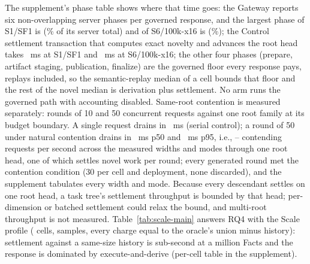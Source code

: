 \documentclass[10pt,journal,compsoc]{IEEEtran}
\begin{document}
The supplement's phase table shows where that time goes: the Gateway
reports six non-overlapping server phases per governed response, and the
largest phase of S1/SF1 is \texttt{\FinalVFivePublicationPhaseDominantSOneSFOne{}}
(\FinalVFivePublicationPhaseDominantSharePctSOneSFOne\% of its server total) and
of S6/100k-x16 is \texttt{\FinalVFivePublicationPhaseDominantSSixHundredKByteSixteen{}}
(\FinalVFivePublicationPhaseDominantSharePctSSixHundredKByteSixteen\%);
the Control settlement transaction that computes exact novelty and advances
the root head takes \FinalVFivePublicationPhaseSettlementMSSOneSFOne{}~ms at
S1/SF1 and \FinalVFivePublicationPhaseSettlementMSSSixHundredKByteSixteen{}~ms
at S6/100k-x16; the other four phases (prepare, artifact staging,
publication, finalize) are the governed floor every response pays,
replays included, so the semantic-replay median of a cell bounds that floor
and the rest of the novel median is derivation plus settlement. No arm runs
the governed path with accounting disabled.
Same-root contention is measured separately: rounds of 10 and 50 concurrent
requests against one root family at its budget boundary. A single request
drains in \FinalVFivePublicationConcurrencySerialDrainPFiftyMS{}~ms (serial
control); a round of 50 under natural contention drains in
\FinalVFivePublicationConcurrencyFiftyNaturalDrainPFiftyMS{}~ms p50 and
\FinalVFivePublicationConcurrencyFiftyNaturalDrainPNinetyFiveMS{}~ms p95,
i.e., \FinalVFivePublicationConcurrencyFiftyNaturalRequestsPerSecond{}--\FinalVFivePublicationConcurrencyTenNaturalRequestsPerSecond{}
contending requests per second across the measured widths and modes through
one root head, one of which settles novel work per round; every generated round met the contention condition (30
per cell and deployment, none discarded), and the supplement tabulates every
width and mode. Because every descendant settles on one root head, a task
tree's settlement throughput is bounded by that head; per-dimension or
batched settlement could relax the bound, and multi-root throughput is not
measured. Table~\ref{tab:scale-main} answers RQ4 with the Scale profile
(\FinalVFivePublicationScaleCells{} cells,
\FinalVFivePublicationScaleSamples{} samples, every charge equal to the
oracle's union minus history): settlement against a same-size history is
sub-second at a million Facts and the response is dominated by
execute-and-derive (per-cell table in the supplement).
\end{document}
